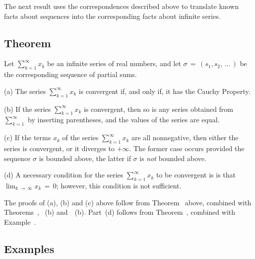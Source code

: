 \V


        The next result uses the correspondences described above to translate known facts about sequences into the corresponding facts about infinite series.

\V

        \subsection{\small{{\bf Theorem}}}
        \label{ThmG30.70}

        Let $\sum_{k=1}^{{\infty}} x_{k}$ be an infinite series of real numbers, and let ${\sigma} \,=\, (s_{1},s_{2},\,{\ldots}\,)$ be the corresponding sequence of partial sums.

\V

        (a) The series $\sum_{k=1}^{{\infty}} x_{k}$ is convergent if, and only if, it has the Cauchy Property.

\V

        (b) If the series $\sum_{k=1}^{{\infty}} x_{k}$ is convergent, then so is any series obtained from $\sum_{k=1}^{{\infty}}$ by inserting parentheses,
    and the values of the series are equal.

\V

        (c) If the terms $x_{k}$ of the series $\sum_{k=1}^{{\infty}} x_{k}$ are all nonnegative,
    then either the series is convergent, or it diverges to $+{\infty}$.
    The former case occurs provided the sequence ${\sigma}$ is bounded above, the latter if ${\sigma}$ is {\em not} bounded above.

\V

        (d) A necessary condition for the series $\sum_{k=1}^{{\infty}} x_{k}$ to be convergent is is that $\lim_{k \,{\rightarrow}\, {\infty}} x_{k} \,=\, 0$;
    however, this condition is not sufficient.

\V

        The proofs of (a), (b) and (c) above follow from Theorem~ above, combined with Theorems~, ~(b) and~~(b).
    Part~(d) follows from Theorem~, combined with Example~.

\V
\V
    
        \subsection{\small{{\bf Examples}}}
        \label{ExampG30.80}
\V

